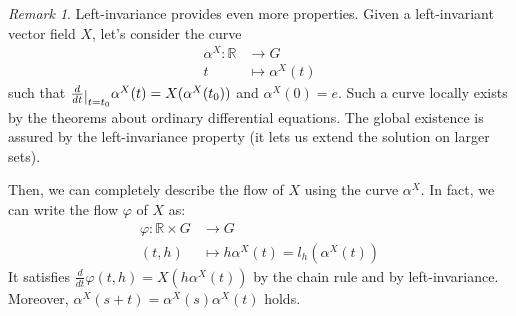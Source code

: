 \documentclass[a4paper,11pt,titlepage, article, oneside]{memoir}
\numberwithin{equation}{section}
\theoremstyle{definition}
\theoremstyle{remark}
\newtheorem{remark}[theorem]{Remark}
\newcommand{\rfield}{\mathbb{R}}
\newcommand{\restrict}[2]{{#1}\raisebox{-.5ex}{$|$}_{#2}}
\newcommand{\diondi}[1]{\frac{d}{d{#1}}}
\begin{document}
\begin{remarkbox} \begin{remark} \label{alphacurve}
Left-invariance provides even more properties. Given a left-invariant vector field $X$, let's consider the curve
\begin{align}
\alpha^X \colon \rfield &\rightarrow G \\
t &\mapsto \alpha^X(t) \nonumber
\end{align}
such that $\restrict{\diondi{t}}{t=t_0} \alpha^X(t) = X(\alpha^X(t_0))$ and $\alpha^X(0)=e$. Such a curve locally exists by the theorems about ordinary differential equations. The global existence is assured by the left-invariance property (it lets us extend the solution on larger sets).

Then, we can completely describe the flow of $X$ using the curve $\alpha^X$. In fact, we can write the flow $\varphi$ of $X$ as:
\begin{align} 
\varphi \colon \rfield \times G & \rightarrow G \\
(t, h) &\mapsto h \alpha^X(t) = l_h (\alpha^X(t)) \nonumber
\end{align}
It satisfies $\diondi{t} \varphi(t, h) = X(h \alpha^X (t))$ by the chain rule and by left-invariance. Moreover, $\alpha^X(s+t) = \alpha^X(s) \alpha^X(t)$ holds.
\end{remark} \end{remarkbox}
\end{document}
